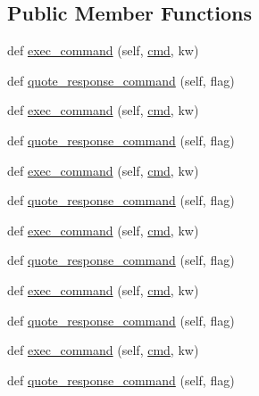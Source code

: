 \subsection*{Public Member Functions}
\begin{DoxyCompactItemize}
\item 
def \hyperlink{classwaflib_1_1_tools_1_1cs_1_1mcs_a37a528e19a48682e93f882769e5c3567}{exec\+\_\+command} (self, \hyperlink{sndfile__play_8m_adfc5ba7e22f5e4a6221c12a70503bef3}{cmd}, kw)
\item 
def \hyperlink{classwaflib_1_1_tools_1_1cs_1_1mcs_a3e0a5b51d31fdd240aaed1914179e79e}{quote\+\_\+response\+\_\+command} (self, flag)
\item 
def \hyperlink{classwaflib_1_1_tools_1_1cs_1_1mcs_a37a528e19a48682e93f882769e5c3567}{exec\+\_\+command} (self, \hyperlink{sndfile__play_8m_adfc5ba7e22f5e4a6221c12a70503bef3}{cmd}, kw)
\item 
def \hyperlink{classwaflib_1_1_tools_1_1cs_1_1mcs_a3e0a5b51d31fdd240aaed1914179e79e}{quote\+\_\+response\+\_\+command} (self, flag)
\item 
def \hyperlink{classwaflib_1_1_tools_1_1cs_1_1mcs_a37a528e19a48682e93f882769e5c3567}{exec\+\_\+command} (self, \hyperlink{sndfile__play_8m_adfc5ba7e22f5e4a6221c12a70503bef3}{cmd}, kw)
\item 
def \hyperlink{classwaflib_1_1_tools_1_1cs_1_1mcs_a3e0a5b51d31fdd240aaed1914179e79e}{quote\+\_\+response\+\_\+command} (self, flag)
\item 
def \hyperlink{classwaflib_1_1_tools_1_1cs_1_1mcs_a37a528e19a48682e93f882769e5c3567}{exec\+\_\+command} (self, \hyperlink{sndfile__play_8m_adfc5ba7e22f5e4a6221c12a70503bef3}{cmd}, kw)
\item 
def \hyperlink{classwaflib_1_1_tools_1_1cs_1_1mcs_a3e0a5b51d31fdd240aaed1914179e79e}{quote\+\_\+response\+\_\+command} (self, flag)
\item 
def \hyperlink{classwaflib_1_1_tools_1_1cs_1_1mcs_a37a528e19a48682e93f882769e5c3567}{exec\+\_\+command} (self, \hyperlink{sndfile__play_8m_adfc5ba7e22f5e4a6221c12a70503bef3}{cmd}, kw)
\item 
def \hyperlink{classwaflib_1_1_tools_1_1cs_1_1mcs_a3e0a5b51d31fdd240aaed1914179e79e}{quote\+\_\+response\+\_\+command} (self, flag)
\item 
def \hyperlink{classwaflib_1_1_tools_1_1cs_1_1mcs_a37a528e19a48682e93f882769e5c3567}{exec\+\_\+command} (self, \hyperlink{sndfile__play_8m_adfc5ba7e22f5e4a6221c12a70503bef3}{cmd}, kw)
\item 
def \hyperlink{classwaflib_1_1_tools_1_1cs_1_1mcs_a3e0a5b51d31fdd240aaed1914179e79e}{quote\+\_\+response\+\_\+command} (self, flag)

\end{DoxyCompactItemize}
